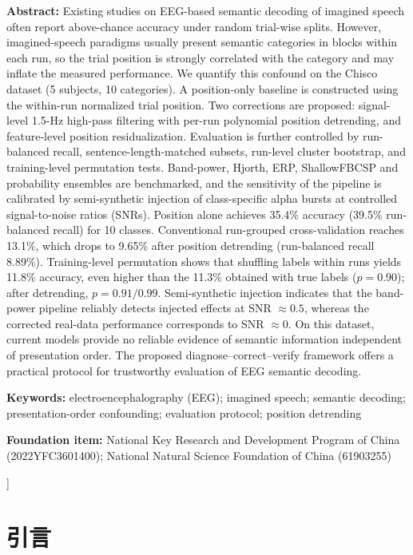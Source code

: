 \documentclass[twocolumn,10pt]{ctexart}
\begin{document}
{\begin{center}
\begin{minipage}{0.94\textwidth}
\noindent\textbf{Abstract:} Existing studies on EEG-based semantic decoding of imagined speech often report above-chance accuracy under random trial-wise splits. However, imagined-speech paradigms usually present semantic categories in blocks within each run, so the trial position is strongly correlated with the category and may inflate the measured performance. We quantify this confound on the Chisco dataset (5 subjects, 10 categories). A position-only baseline is constructed using the within-run normalized trial position. Two corrections are proposed: signal-level 1.5-Hz high-pass filtering with per-run polynomial position detrending, and feature-level position residualization. Evaluation is further controlled by run-balanced recall, sentence-length-matched subsets, run-level cluster bootstrap, and training-level permutation tests. Band-power, Hjorth, ERP, ShallowFBCSP and probability ensembles are benchmarked, and the sensitivity of the pipeline is calibrated by semi-synthetic injection of class-specific alpha bursts at controlled signal-to-noise ratios (SNRs). Position alone achieves 35.4\% accuracy (39.5\% run-balanced recall) for 10 classes. Conventional run-grouped cross-validation reaches 13.1\%, which drops to 9.65\% after position detrending (run-balanced recall 8.89\%). Training-level permutation shows that shuffling labels within runs yields 11.8\% accuracy, even higher than the 11.3\% obtained with true labels ($p=0.90$); after detrending, $p=0.91/0.99$. Semi-synthetic injection indicates that the band-power pipeline reliably detects injected effects at SNR $\approx 0.5$, whereas the corrected real-data performance corresponds to SNR $\approx 0$. On this dataset, current models provide no reliable evidence of semantic information independent of presentation order. The proposed diagnose--correct--verify framework offers a practical protocol for trustworthy evaluation of EEG semantic decoding.

\noindent\textbf{Keywords:} electroencephalography (EEG); imagined speech; semantic decoding; presentation-order confounding; evaluation protocol; position detrending

\noindent\textbf{Foundation item:} National Key Research and Development Program of China (2022YFC3601400); National Natural Science Foundation of China (61903255)
\end{minipage}
\end{center}
\vspace{0.8em}
}]

\section{引言}
\end{document}
